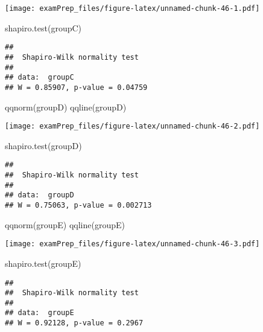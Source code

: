 \documentclass[
]{article}
\newenvironment{Shaded}{\begin{snugshade}}{\end{snugshade}}
\newcommand{\FunctionTok}[1]{\textcolor[rgb]{0.00,0.00,0.00}{#1}}
\newcommand{\NormalTok}[1]{#1}
\begin{document}
\texttt{[image: examPrep\_files/figure-latex/unnamed-chunk-46-1.pdf]}

\begin{Shaded}
\begin{Highlighting}[]
\FunctionTok{shapiro.test}\NormalTok{(groupC)}
\end{Highlighting}
\end{Shaded}

\begin{verbatim}
## 
##  Shapiro-Wilk normality test
## 
## data:  groupC
## W = 0.85907, p-value = 0.04759
\end{verbatim}

\begin{Shaded}
\begin{Highlighting}[]
\FunctionTok{qqnorm}\NormalTok{(groupD)}
\FunctionTok{qqline}\NormalTok{(groupD)}
\end{Highlighting}
\end{Shaded}

\texttt{[image: examPrep\_files/figure-latex/unnamed-chunk-46-2.pdf]}

\begin{Shaded}
\begin{Highlighting}[]
\FunctionTok{shapiro.test}\NormalTok{(groupD)}
\end{Highlighting}
\end{Shaded}

\begin{verbatim}
## 
##  Shapiro-Wilk normality test
## 
## data:  groupD
## W = 0.75063, p-value = 0.002713
\end{verbatim}

\begin{Shaded}
\begin{Highlighting}[]
\FunctionTok{qqnorm}\NormalTok{(groupE)}
\FunctionTok{qqline}\NormalTok{(groupE)}
\end{Highlighting}
\end{Shaded}

\texttt{[image: examPrep\_files/figure-latex/unnamed-chunk-46-3.pdf]}

\begin{Shaded}
\begin{Highlighting}[]
\FunctionTok{shapiro.test}\NormalTok{(groupE)}
\end{Highlighting}
\end{Shaded}

\begin{verbatim}
## 
##  Shapiro-Wilk normality test
## 
## data:  groupE
## W = 0.92128, p-value = 0.2967
\end{verbatim}
\end{document}
